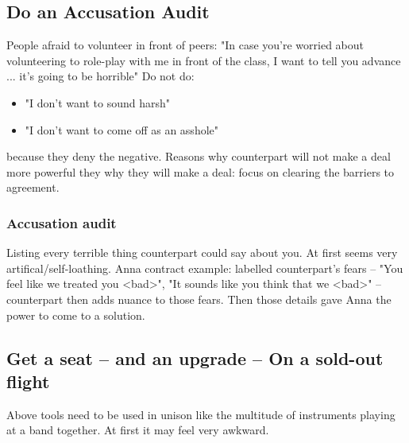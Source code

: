 \documentclass{summary}
\begin{document}
\subsection{Do an Accusation Audit}
People afraid to volunteer in front of peers: "In case you're worried about volunteering to role-play with me in front of the class, I want to tell you advance ... it's going to be horrible"
Do not do:
\begin{itemize}
  \item "I don't want to sound harsh"
  \item "I don't want to come off as an asshole"
\end{itemize}
because they deny the negative. Reasons why counterpart will not make a deal more powerful they why they will make a deal: focus on clearing the barriers to agreement.

\subsubsection*{Accusation audit}
Listing every terrible thing counterpart could say about you. At first seems very artifical/self-loathing. Anna contract example: labelled counterpart's fears -- "You feel like we treated you <bad>", "It sounds like you think that we <bad>" -- counterpart then adds nuance to those fears. Then those details gave Anna the power to come to a solution.

\subsection{Get a seat -- and an upgrade -- On a sold-out flight}
Above tools need to be used in unison like the multitude of instruments playing at a band together. At first it may feel very awkward.
\end{document}
